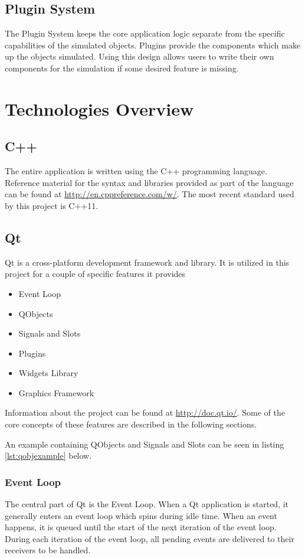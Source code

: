\subsection{Plugin System}
The Plugin System keeps the core application logic separate from the specific capabilities of the simulated objects. Plugins provide the components which make up the objects simulated. Using this design allows users to write their own components for the simulation if some desired feature is missing.

\section{Technologies Overview}
\subsection{C++}
	The entire application is written using the C++ programming language. Reference material for the syntax and libraries provided as part of the language can be found at \url{http://en.cppreference.com/w/}. The most recent standard used by this project is C++11.
	
\subsection{Qt}
	Qt is a cross-platform development framework and library. It is utilized in this project for a couple of specific features it provides
	\begin{itemize}
		\item Event Loop
		\item QObjects
		\item Signals and Slots
		\item Plugins
		\item Widgets Library
		\item Graphics Framework
	\end{itemize}
	Information about the project can be found at \url{http://doc.qt.io/}. Some of the core concepts of these features are described in the following sections.
	
	An example containing QObjects and Signals and Slots can be seen in listing \ref{lst:qobjexample} below.
	
\subsubsection*{Event Loop}
	The central part of Qt is the Event Loop. When a Qt application is started, it generally enters an event loop which spins during idle time. When an event happens, it is queued until the start of the next iteration of the event loop. During each iteration of the event loop, all pending events are delivered to their receivers to be handled.
	
